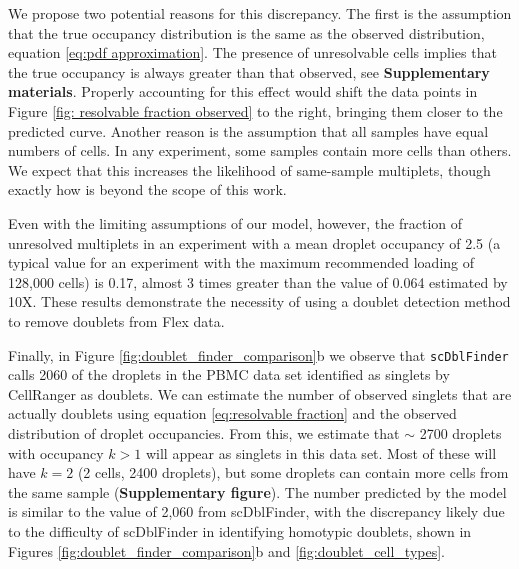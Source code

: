 \documentclass[unnumsec,webpdf,modern,large]{oup-authoring-template}
\begin{document}
	We propose two potential reasons for this discrepancy. 
	The first is the assumption that the true occupancy distribution is the same as the observed distribution, equation \ref{eq:pdf approximation}.
	The presence of unresolvable cells implies that the true occupancy is always greater than that observed, see \textbf{Supplementary materials}.
	 Properly accounting for this effect would shift the data points in Figure \ref{fig: resolvable fraction observed} to the right, bringing them closer to the predicted curve. 	
	Another reason is the assumption that all samples have equal numbers of cells. 
	In any experiment, some samples contain more cells than others. We expect that this increases the likelihood of same-sample multiplets, though exactly how is beyond the scope of this work. 
	
	Even with the limiting assumptions of our model, however, the fraction of unresolved multiplets in an experiment with a mean droplet occupancy of 2.5 (a typical value for an experiment with the maximum recommended loading of 128,000 cells) is 0.17, almost 3 times greater than the value of 0.064 estimated by 10X. These results demonstrate the necessity of using a doublet detection method to remove doublets from Flex data. 
		
	Finally, in Figure \ref{fig:doublet_finder_comparison}b we observe that \texttt{scDblFinder} calls 2060 of the droplets in the PBMC data set identified as singlets by CellRanger as doublets. 
	We can estimate the number of observed singlets that are actually doublets using equation \eqref{eq:resolvable fraction} and the observed distribution of droplet occupancies. 
	From this, we estimate that $\sim$ 2700 droplets with occupancy $k > 1$ will appear as singlets in this data set. 
	Most of these will have $k=2$ (2 cells, 2400 droplets), but some droplets can contain more cells from the same sample (\textbf{Supplementary figure}). 
	The number predicted by the model is similar to the value of 2,060 from scDblFinder, with the discrepancy likely due to the difficulty of scDblFinder in identifying homotypic doublets, shown in Figures  \ref{fig:doublet_finder_comparison}b and \ref{fig:doublet_cell_types}.
	
\end{document}
